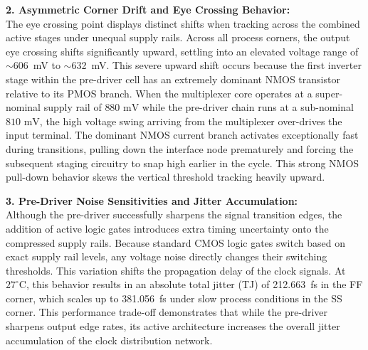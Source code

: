 \textbf{2. Asymmetric Corner Drift and Eye Crossing Behavior:} \\
The eye crossing point displays distinct shifts when tracking across the combined active stages under unequal supply rails. Across all process corners, the output eye crossing shifts significantly upward, settling into an elevated voltage range of $\sim$606~mV to $\sim$632~mV. This severe upward shift occurs because the first inverter stage within the pre-driver cell has an extremely dominant NMOS transistor relative to its PMOS branch. When the multiplexer core operates at a super-nominal supply rail of $880\text{ mV}$ while the pre-driver chain runs at a sub-nominal $810\text{ mV}$, the high voltage swing arriving from the multiplexer over-drives the input terminal. The dominant NMOS current branch activates exceptionally fast during transitions, pulling down the interface node prematurely and forcing the subsequent staging circuitry to snap high earlier in the cycle. This strong NMOS pull-down behavior skews the vertical threshold tracking heavily upward.

\textbf{3. Pre-Driver Noise Sensitivities and Jitter Accumulation:} \\
Although the pre-driver successfully sharpens the signal transition edges, the addition of active logic gates introduces extra timing uncertainty onto the compressed supply rails. Because standard CMOS logic gates switch based on exact supply rail levels, any voltage noise directly changes their switching thresholds. This variation shifts the propagation delay of the clock signals. At $27^{\circ}\text{C}$, this behavior results in an absolute total jitter (TJ) of 212.663~fs in the FF corner, which scales up to 381.056~fs under slow process conditions in the SS corner. This performance trade-off demonstrates that while the pre-driver sharpens output edge rates, its active architecture increases the overall jitter accumulation of the clock distribution network.

